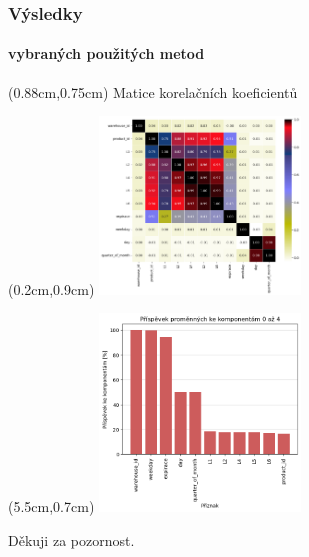 \documentclass{beamer}
\theoremstyle{definition}
\begin{document}
\begin{frame}
    \frametitle{Výsledky}
	\framesubtitle{vybraných použitých metod}
	\begin{textblock*}{10cm}(0.88cm,0.75cm)
		\tiny Matice korelačních koeficientů
	   \end{textblock*}

	\begin{textblock*}{10cm}(0.2cm,0.9cm)
        \includegraphics[width=0.4\textwidth]{pearson.png}
    \end{textblock*}
	\begin{textblock*}{10cm}(5.5cm,0.7cm)
        \includegraphics[width=0.4\textwidth]{pca-prispevky.png}
    \end{textblock*}
	\vspace{5cm}
	
	

\end{frame}



\begin{frame}
    \Large{\centerline{Děkuji za pozornost.}}
\end{frame}
\end{document}
